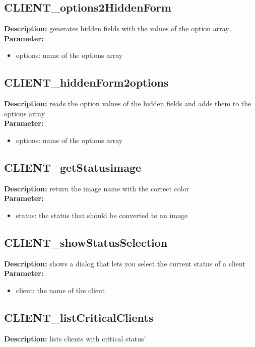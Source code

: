 \subsection{CLIENT\_options2HiddenForm}
\textbf{Description:} generates hidden fields with the values of the option array\\
\textbf{Parameter:}
\begin{itemize}
\item options: name of the options array
\end{itemize}

\subsection{CLIENT\_hiddenForm2options}
\textbf{Description:} reads the option values of the hidden fields and adds them to the options array\\
\textbf{Parameter:}
\begin{itemize}
\item options: name of the options array
\end{itemize}

\subsection{CLIENT\_getStatusimage}
\textbf{Description:} return the image name with the correct color\\
\textbf{Parameter:}
\begin{itemize}
\item status: the status that should be converted to an image
\end{itemize}

\subsection{CLIENT\_showStatusSelection}
\textbf{Description:} shows a dialog that lets you select the current status of a client\\
\textbf{Parameter:}
\begin{itemize}
\item client: the name of the client
\end{itemize}

\subsection{CLIENT\_listCriticalClients}
\textbf{Description:} lists clients with critical status'\\

